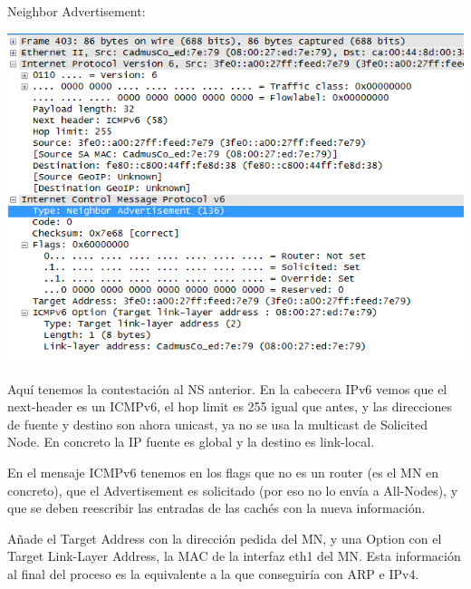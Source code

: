\documentclass{article}
\begin{document}
\hfill

\hfill

Neighbor Advertisement:

\begin{center} 
	\includegraphics[scale=0.8]{images/neighAdv.png}
\end{center}

Aquí tenemos la contestación al NS anterior. En la cabecera IPv6 vemos que el next-header es un ICMPv6, el hop limit es 255 igual que antes, y las direcciones de fuente y destino son ahora unicast, ya no se usa la multicast de Solicited Node. En concreto la IP fuente es global y la destino es link-local.

En el mensaje ICMPv6 tenemos en los flags que no es un router (es el MN en concreto), que el Advertisement es solicitado (por eso no lo envía a All-Nodes), y que se deben reescribir las entradas de las cachés con la nueva información.

Añade el Target Address con la dirección pedida del MN, y una Option con el Target Link-Layer Address, la MAC de la interfaz eth1 del MN. Esta información al final del proceso es la equivalente a la que conseguiría con ARP e IPv4.


\appendix
\end{document}
